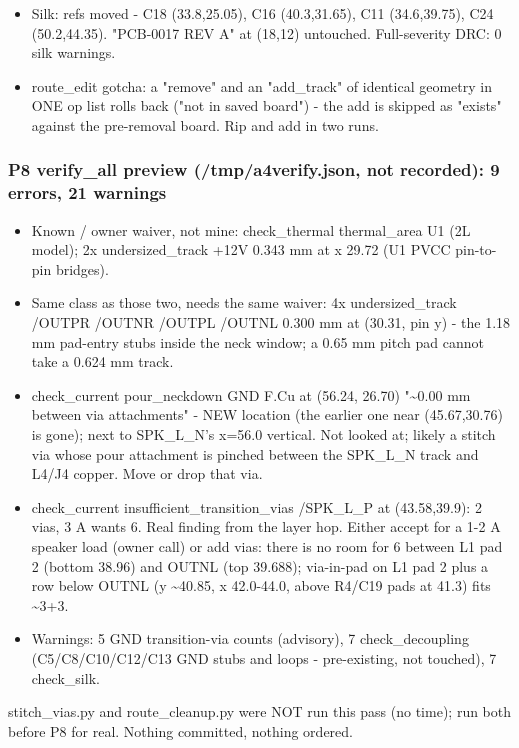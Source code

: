 \documentclass[11pt]{article}
\begin{document}
\begin{itemize}
pad 1 -\textgreater{} down to y 43.95 -\textgreater{} J3 as before; C19 pad 1 is fed by a branch from (43.15,42.97) running
BELOW C19's GND pad at y 42.97 and entering pad 1 from below (fixes the short + mask bridge).
\item Silk: refs moved - C18 (33.8,25.05), C16 (40.3,31.65), C11 (34.6,39.75), C24 (50.2,44.35).
"PCB-0017 REV A" at (18,12) untouched. Full-severity DRC: 0 silk warnings.
\item route\_edit gotcha: a "remove" and an "add\_track" of identical geometry in ONE op list rolls back
("not in saved board") - the add is skipped as "exists" against the pre-removal board. Rip and
add in two runs.
\end{itemize}
\subsubsection*{P8 verify\_all preview (/tmp/a4verify.json, not recorded): 9 errors, 21 warnings}
\begin{itemize}
\item Known / owner waiver, not mine: check\_thermal thermal\_area U1 (2L model); 2x undersized\_track
+12V 0.343 mm at x 29.72 (U1 PVCC pin-to-pin bridges).
\item Same class as those two, needs the same waiver: 4x undersized\_track /OUTPR /OUTNR /OUTPL /OUTNL
0.300 mm at (30.31, pin y) - the 1.18 mm pad-entry stubs inside the neck window; a 0.65 mm pitch
pad cannot take a 0.624 mm track.
\item check\_current pour\_neckdown GND F.Cu at (56.24, 26.70) "\textasciitilde{}0.00 mm between via attachments" - NEW
location (the earlier one near (45.67,30.76) is gone); next to SPK\_L\_N's x=56.0 vertical. Not
looked at; likely a stitch via whose pour attachment is pinched between the SPK\_L\_N track and
L4/J4 copper. Move or drop that via.
\item check\_current insufficient\_transition\_vias /SPK\_L\_P at (43.58,39.9): 2 vias, 3 A wants 6. Real
finding from the layer hop. Either accept for a 1-2 A speaker load (owner call) or add vias: there
is no room for 6 between L1 pad 2 (bottom 38.96) and OUTNL (top 39.688); via-in-pad on L1 pad 2
plus a row below OUTNL (y \textasciitilde{}40.85, x 42.0-44.0, above R4/C19 pads at 41.3) fits \textasciitilde{}3+3.
\item Warnings: 5 GND transition-via counts (advisory), 7 check\_decoupling (C5/C8/C10/C12/C13 GND stubs
and loops - pre-existing, not touched), 7 check\_silk.
\end{itemize}
stitch\_vias.py and route\_cleanup.py were NOT run this pass (no time); run both before P8 for real. Nothing committed, nothing ordered.
\end{document}

